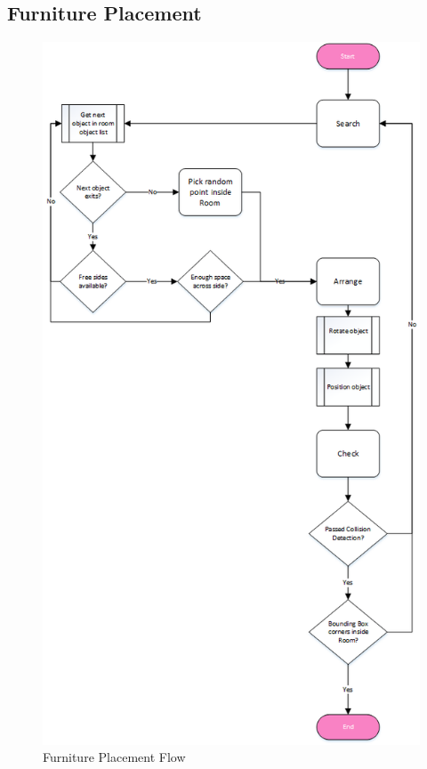 \clearpage
\subsection{Furniture Placement}
\begin{figure}[H]
\centering\includegraphics[width=0.95\linewidth, height=0.7\paperheight, keepaspectratio=true]{images/RoomGeneration_FurniturePlacement_Flowchart}
  \caption{Furniture Placement Flow}
  \label{fig:flow_furniture_placement}
\end{figure}

